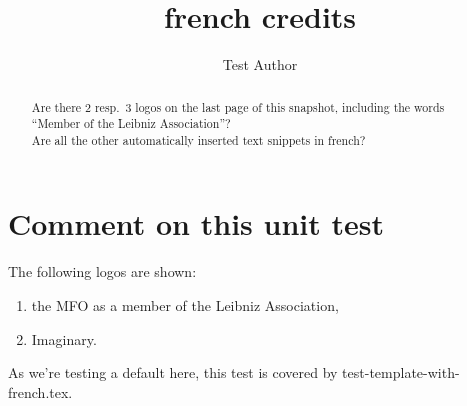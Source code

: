 \documentclass{snapshotmfo}
\author{Test Author}
\title{french credits}
\begin{document}
\begin{abstract}
Are there 2 resp.\ 3 logos on the last page of this snapshot, including the words ``Member of the Leibniz Association''?\\
Are all the other automatically inserted text snippets in french?
\end{abstract}

\section{Comment on this unit test}
The following logos are shown:
\begin{enumerate}
  \item the MFO as a member of the Leibniz Association,
  \item Imaginary.
\end{enumerate}
As we're testing a default here, this test is covered by test-template-with-french.tex.
\end{document}
